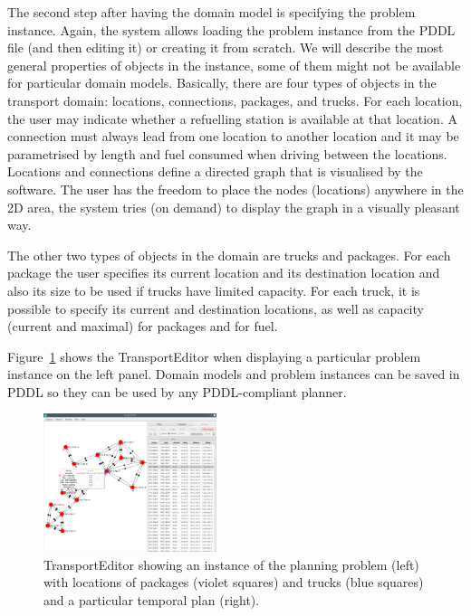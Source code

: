 \documentclass[letterpaper]{article}
\begin{document}
The second step after having the domain model is specifying the problem instance. Again, the system allows loading the problem instance from the PDDL file (and then editing it) or creating it from scratch. We will describe the most general properties of objects in the instance, some of them might not be available for particular domain models. Basically, there are four types of objects in the transport domain: locations, connections, packages, and trucks. For each location, the user may indicate whether a refuelling station is available at that location. A connection must always lead from one location to another location and it may be parametrised by length and fuel consumed when driving between the locations. Locations and connections define a directed graph that is visualised by the software. The user has the freedom to place the nodes (locations) anywhere in the 2D area, the system tries (on demand) to display the graph in a visually pleasant way.

The other two types of objects in the domain are trucks and packages. For each package the user specifies its current location and its destination location and also its size to be used if trucks have limited capacity. For each truck, it is possible to specify its current and destination locations, as well as capacity (current and maximal) for packages and for fuel.

Figure~\ref{fig:editor} shows the TransportEditor when displaying a particular problem instance on the left panel. Domain models and problem instances can be saved in PDDL so they can be used by any PDDL-compliant planner.

\begin{figure}[t]
        \centering
        \includegraphics[width=0.45\textwidth]{editor.png}
        \caption{TransportEditor showing an instance of the planning problem (left) with locations of packages (violet squares)  and trucks (blue squares) and a particular temporal plan (right).}
    \label{fig:editor}
\end{figure}
\end{document}

